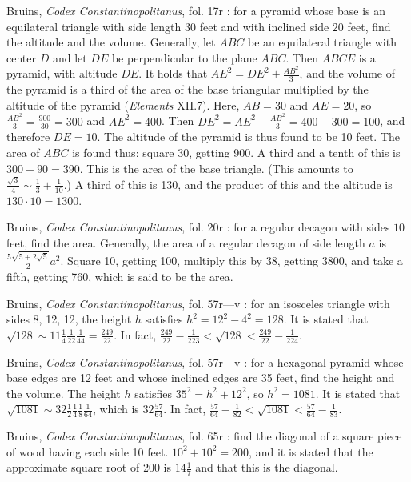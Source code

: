 \documentclass{article}
\theoremstyle{definition}
\begin{document}
Bruins, {\em Codex Constantinopolitanus}, fol. 17r \cite[p.~42]{constantinopolitanus}:
for a pyramid whose base is an equilateral triangle with side length $30$ feet and 
with inclined side $20$ feet, find the altitude and the volume. 
Generally, 
let $ABC$ be an equilateral triangle with center $D$ and let
$DE$ be perpendicular to the plane $ABC$. Then $ABCE$ is a pyramid, with altitude 
$DE$. It holds that $AE^2 = DE^2 + \frac{AB^2}{3}$, and the volume of
the pyramid is a third of the area of the base triangular multiplied by the
altitude of the pyramid ({\em Elements} XII.7).
Here, $AB=30$ and $AE=20$, so $\frac{AB^2}{3}=\frac{900}{30}=300$ and
$AE^2 = 400$. Then $DE^2 = AE^2 - \frac{AB^2}{3} = 400-300=100$, and therefore
$DE=10$. The altitude of the pyramid is thus found to be 10 feet. 
The area of $ABC$ is found thus: square 30, getting 900. A third and a tenth of this is
$300+90=390$. This is the area of the base triangle. (This amounts to
$\frac{\sqrt{3}}{4} \sim \frac{1}{3}+\frac{1}{10}$.)
A third of this is 130, and the product of this and the altitude is $130 \cdot 10=1300$. 

Bruins, {\em Codex Constantinopolitanus}, fol. 20r \cite[p.~58]{constantinopolitanus}:
for a regular decagon with sides $10$ feet, find the area. 
Generally, the area of a regular decagon of side length $a$ is 
$\frac{5 \sqrt{5+2\sqrt{5}}}{2}a^2$. 
Square 10, getting 100,  multiply this by 38, getting 3800, and take a fifth, getting 
760, which is said to be the area.

Bruins, {\em Codex Constantinopolitanus}, fol. 57r---v \cite[p.~160]{constantinopolitanus}:
for an isosceles triangle with sides $8$, 12, 12, the height $h$ satisfies $h^2=12^2-4^2=128$.
It is stated that $\sqrt{128} \sim 11 \frac{1}{4} \frac{1}{22} \frac{1}{44} = \frac{249}{22}$. In fact,
$\frac{249}{22} - \frac{1}{223} < \sqrt{128} <  \frac{249}{22} - \frac{1}{224}$. 

Bruins, {\em Codex Constantinopolitanus}, fol. 57r---v \cite[p.~165]{constantinopolitanus}:
for a hexagonal pyramid whose base edges are 12 feet and whose inclined edges are 35 feet,
find the height and the volume. The height $h$ satisfies $35^2 = h^2+12^2$, so
$h^2=1081$. It is stated that $\sqrt{1081} \sim 32 \frac{1}{2} \frac{1}{4} \frac{1}{8} \frac{1}{64}$, which is $32 \frac{57}{64}$. 
In fact,
$\frac{57}{64}-\frac{1}{82}<\sqrt{1081}<\frac{57}{64}-\frac{1}{83}$. 

Bruins, {\em Codex Constantinopolitanus}, fol. 65r \cite[p.~178]{constantinopolitanus}:
find the diagonal of a square piece of wood having each side 10 feet. $10^2+10^2=200$, and it is stated that the approximate
square root of 200 is $14 \frac{1}{7}$ and that this is the diagonal.
\end{document}
